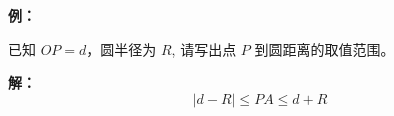 \begin{examplebox}
\textbf{例：}

已知 $OP=d$，圆半径为 $R$,
请写出点 $P$ 到圆距离的取值范围。

\textbf{解：}
\[
|d-R| \le PA \le d+R
\]
\end{examplebox}
